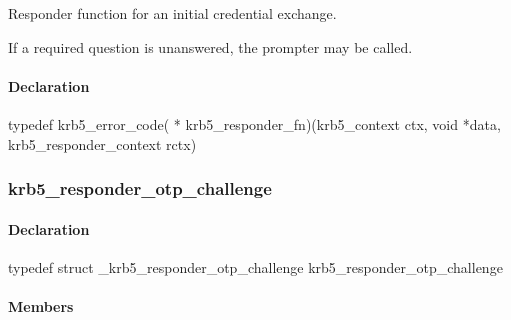 \documentclass[letterpaper,10pt,english]{sphinxmanual}
\begin{document}
Responder function for an initial credential exchange.

If a required question is unanswered, the prompter may be called.


\paragraph{Declaration}
\label{appdev/refs/types/krb5_responder_fn:declaration}
typedef krb5\_error\_code( * krb5\_responder\_fn)(krb5\_context ctx, void *data, krb5\_responder\_context rctx)


\subsubsection{krb5\_responder\_otp\_challenge}
\label{appdev/refs/types/krb5_responder_otp_challenge:krb5-responder-otp-challenge}\label{appdev/refs/types/krb5_responder_otp_challenge:krb5-responder-otp-challenge-struct}\label{appdev/refs/types/krb5_responder_otp_challenge::doc}

\begin{fulllineitems}
\label{appdev/refs/types/krb5_responder_otp_challenge:c.krb5_responder_otp_challenge}
\end{fulllineitems}



\paragraph{Declaration}
\label{appdev/refs/types/krb5_responder_otp_challenge:declaration}
typedef struct \_krb5\_responder\_otp\_challenge  krb5\_responder\_otp\_challenge


\paragraph{Members}
\label{appdev/refs/types/krb5_responder_otp_challenge:members}

\begin{fulllineitems}
\label{appdev/refs/types/krb5_responder_otp_challenge:c.krb5_responder_otp_challenge.service}
\end{fulllineitems}

\end{document}
